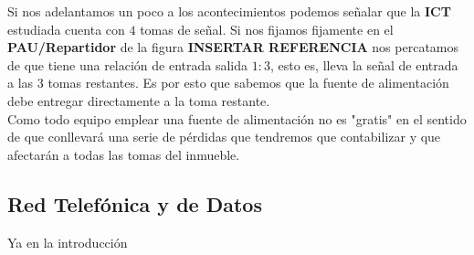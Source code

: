 \documentclass{article}[12 pt]
\begin{document}
			Si nos adelantamos un poco a los acontecimientos podemos señalar que la \textbf{ICT} estudiada cuenta con $4$ tomas de señal. Si nos fijamos fijamente en el \textbf{PAU/Repartidor} de la figura \textbf{INSERTAR REFERENCIA} nos percatamos de que tiene una relación de entrada salida $1:3$, esto es, lleva la señal de entrada a las $3$ tomas restantes. Es por esto que sabemos que la fuente de alimentación debe entregar directamente a la toma restante.\\

			Como todo equipo emplear una fuente de alimentación no es "gratis" en el sentido de que conllevará una serie de pérdidas que tendremos que contabilizar y que afectarán a todas las tomas del inmueble.\\

		\subsection{Red Telefónica y de Datos}
			Ya en la introducción
\end{document}

